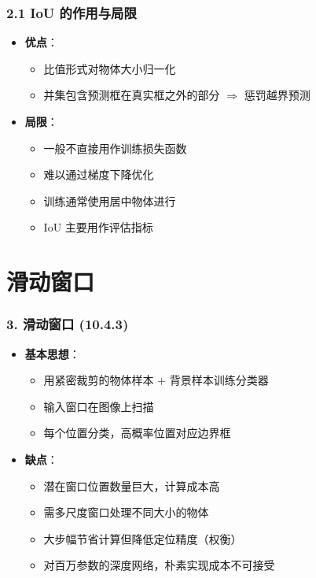 \documentclass[t,aspectratio=169]{beamer} %
\begin{document}
\begin{frame}
    \frametitle{2.1 IoU 的作用与局限}
    \begin{itemize}
        \item \textbf{优点}：
        \begin{itemize}
            \item 比值形式对物体大小\alert{归一化}
            \item 并集包含预测框在真实框之外的部分 $\Rightarrow$ \alert{惩罚越界预测}
        \end{itemize}
        \item \textbf{局限}：
        \begin{itemize}
            \item 一般\alert{不直接用作训练损失函数}
            \item 难以通过梯度下降优化
            \item 训练通常使用\alert{居中物体}进行
            \item IoU 主要用作\alert{评估指标}
        \end{itemize}
    \end{itemize}
\end{frame}

\section{滑动窗口}

\begin{frame}
    \frametitle{3. 滑动窗口 (10.4.3)}
    \begin{itemize}
        \item \textbf{基本思想}：
        \begin{itemize}
            \item 用紧密裁剪的物体样本 + 背景样本训练分类器
            \item 输入窗口在图像上\alert{扫描}
            \item 每个位置分类，高概率位置对应边界框
        \end{itemize}
        \item \textbf{缺点}：
        \begin{itemize}
            \item 潜在窗口位置数量\alert{巨大}，计算成本高
            \item 需多尺度窗口处理不同大小的物体
            \item 大步幅节省计算但\alert{降低定位精度}（权衡）
            \item 对百万参数的深度网络，朴素实现成本\alert{不可接受}
        \end{itemize}
    \end{itemize}
\end{frame}
\end{document}
